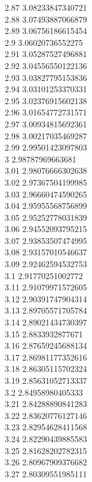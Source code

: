 {2.87	3.08233847340721\\
2.88	3.07493887066879\\
2.89	3.06756186615454\\
2.9	3.06020736552275\\
2.91	3.05287527496881\\
2.92	3.04556550122136\\
2.93	3.03827795153836\\
2.94	3.03101253370331\\
2.95	3.02376915602138\\
2.96	3.01654772731571\\
2.97	3.00934815692361\\
2.98	3.00217035469287\\
2.99	2.99501423097803\\
3	2.98787969663681\\
3.01	2.98076666302638\\
3.02	2.97367504199985\\
3.03	2.96660474590265\\
3.04	2.95955568756899\\
3.05	2.95252778031839\\
3.06	2.94552093795215\\
3.07	2.93853507474995\\
3.08	2.93157010546637\\
3.09	2.92462594532753\\
3.1	2.91770251002772\\
3.11	2.91079971572605\\
3.12	2.90391747904314\\
3.13	2.89705571705784\\
3.14	2.89021434730397\\
3.15	2.8833932877671\\
3.16	2.87659245688134\\
3.17	2.86981177352616\\
3.18	2.86305115702324\\
3.19	2.85631052713337\\
3.2	2.84958980405333\\
3.21	2.84288890841283\\
3.22	2.83620776127146\\
3.23	2.82954628411568\\
3.24	2.82290439885583\\
3.25	2.81628202782315\\
3.26	2.80967909376682\\
3.27	2.80309551985111\\
}
